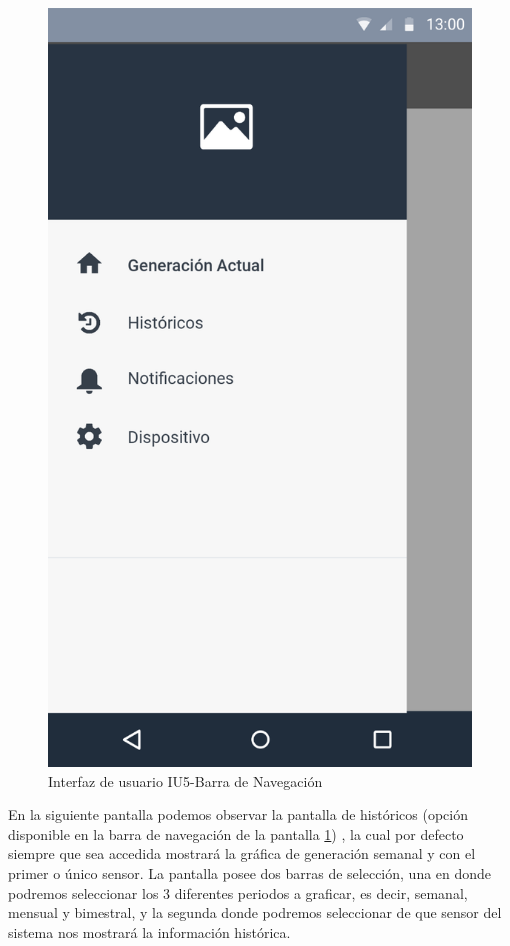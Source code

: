 \begin{figure}[H]
	\centering
	\includegraphics[scale=0.70]{Capitulo4/software/submodulos/images/navegacion.png}
	\caption{Interfaz de usuario IU5-Barra de Navegación}
	\label{fig:Barra de navegacion}
\end{figure}

En la siguiente pantalla podemos observar la pantalla de históricos (opción disponible en la barra de navegación de la pantalla \ref{fig:Barra de navegacion}) , la cual por defecto siempre que sea accedida mostrará la gráfica de generación semanal y con el primer o único sensor. La pantalla posee dos barras de selección, una en donde podremos seleccionar los 3 diferentes periodos a graficar, es decir, semanal, mensual y bimestral, y la segunda donde podremos seleccionar de que sensor del sistema nos mostrará la información histórica. 

